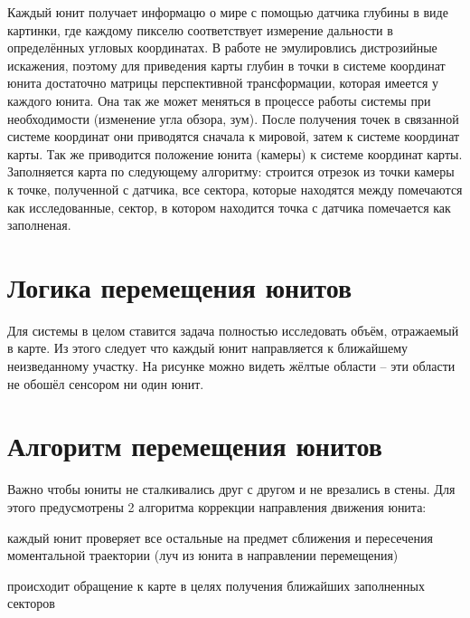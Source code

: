 Каждый юнит получает информацю о мире с помощью датчика глубины в виде картинки,
где каждому пикселю соответствует измерение дальности в определённых угловых координатах. В работе не эмулировлись
дистрозийные искажения, поэтому для приведения карты глубин в точки в системе координат юнита достаточно 
матрицы перспективной трансформации, которая имеется у каждого юнита. Она так же может меняться в процессе работы
системы при необходимости (изменение угла обзора, зум). После получения точек в связанной системе координат они приводятся
сначала к мировой, затем к системе координат карты. Так же приводится положение юнита (камеры) к системе координат карты.
Заполняется карта по следующему алгоритму: строится отрезок из точки камеры к точке, полученной с датчика, все сектора, которые
находятся между помечаются как исследованные, сектор, в котором находится точка с датчика помечается как заполненая.

\section{Логика перемещения юнитов}

Для системы в целом ставится задача полностью исследовать объём, отражаемый в карте.
Из этого следует что каждый юнит направляется к ближайшему неизведанному участку. 
На рисунке можно видеть жёлтые области -- эти области не обошёл сенсором ни один юнит.

\section{Алгоритм перемещения юнитов}

Важно чтобы юниты не сталкивались друг с другом и не врезались в стены.
Для этого предусмотрены 2 алгоритма коррекции направления движения юнита: 
\begin{mintemize}
    \item каждый юнит проверяет все остальные на предмет сближения и пересечения моментальной траектории
            (луч из юнита в направлении перемещения)
    \item происходит обращение к карте в целях получения ближайших заполненных секторов
\end{mintemize}
